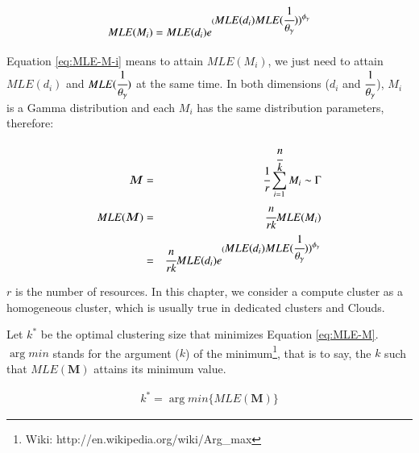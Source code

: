 \begin{equation} 
\label{eq:MLE-M-i}
MLE(M_i)=MLE(d_i)e^{(\displaystyle MLE(d_i)MLE(\cfrac{1}{\theta_{\gamma}}))^{\phi_{\gamma}}} 
\end{equation}

Equation \ref{eq:MLE-M-i} means to attain $MLE(M_i)$, we just need to attain $MLE(d_i)$ and $MLE(\cfrac{1}{\theta_{\gamma}})$ at the same time. 
In both dimensions ($d_i$ and $\displaystyle\cfrac{1}{\theta_{\gamma}}$), $M_i$ is a Gamma distribution and each $M_i$ has the same distribution parameters, therefore:

\begin{eqnarray} 
\label{eq:MLE-M}
\bm{M}&=&\displaystyle\cfrac{1}{r}\sum_{i=1}^{\cfrac{n}{k}}M_i\sim\Gamma \nonumber\\
MLE(\bm{M})&=&\displaystyle\cfrac{n}{rk}MLE(M_i)\\
&=&\displaystyle\cfrac{n}{rk} MLE(d_i)e^{(\displaystyle MLE(d_i)MLE(\cfrac{1}{\theta_{\gamma}}))^{\phi_{\gamma}}} 
\end{eqnarray}

$r$ is the number of resources. In this chapter, we consider a compute cluster as a homogeneous cluster, which is usually true in dedicated clusters and Clouds. 




Let $k^*$ be the optimal clustering size that minimizes Equation \ref{eq:MLE-M}.  $\arg min$  stands for the argument ($k$) of the minimum\footnote{Wiki: http://en.wikipedia.org/wiki/Arg\_max}, that is to say, the $k$ such that $MLE(\bm{M})$ attains its minimum value. 

\begin{eqnarray} 
\label{eq:k_optimal}
k^*=\arg min\{MLE(\bm{M})\} 
\end{eqnarray}

